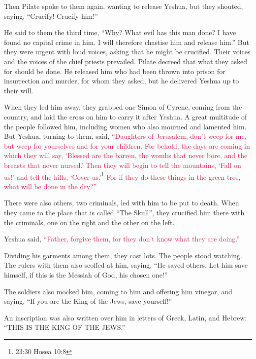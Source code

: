 \myverse{}Then Pilate spoke to them again, wanting to release Yeshua,
\myverse{}but they shouted, saying, “Crucify! Crucify him!”

\myverse{}He said to them the third time, “Why? What evil has this man
done? I have found no capital crime in him. I will therefore chastise him and release him.”
\myverse{}But they were urgent with loud voices, asking that he might be crucified.
Their voices and the voices of the chief priests prevailed.
\myverse{}Pilate decreed that what they asked for should be done.
\myverse{}He released him who had been thrown into prison for insurrection and murder,
for whom they asked, but he delivered Yeshua up to their will.

\myverse{}When they led him away, they grabbed one Simon of Cyrene, coming
from the country, and laid the cross on him to carry it after Yeshua.
\myverse{}A great multitude of the people followed him, including women who also mourned
and lamented him.
\myverse{}But Yeshua, turning to them, said,
\textcolor{crimson}{“Daughters of Jerusalem, don’t weep for me, but weep for yourselves and for your children.
}
\myverse{}\textcolor{crimson}{For behold, the days are coming in which they will say, ‘Blessed are
	the barren, the wombs that never bore, and the breasts that never nursed.’
}
\myverse{}\textcolor{crimson}{Then they will begin to tell the mountains, ‘Fall on us!’ and tell the
	hills, ‘Cover us.’}\footnote{ 23:30 Hosea 10:8}
\myverse{}\textcolor{crimson}{For if they do these things in the green tree, what will be done in the
	dry?”}

\myverse{}There were also others, two criminals, led with him to be put
to death.
\myverse{}When they came to the place that is called “The Skull”, they crucified him
there with the criminals, one on the right and the other on the left.

\myverse{}Yeshua said,
\textcolor{crimson}{“Father, forgive them, for they don’t know what they are doing.”}

Dividing his garments among them, they cast lots.
\myverse{}The people stood watching. The rulers with them also scoffed at him, saying,
“He saved others. Let him save himself, if this is the Messiah of God, his chosen one!”

\myverse{}The soldiers also mocked him, coming to him and offering him
vinegar,
\myverse{}and saying, “If you are the King of the Jews, save yourself!”

\myverse{}An inscription was also written over him in letters of Greek,
Latin, and Hebrew: “THIS IS THE KING OF THE JEWS.”

